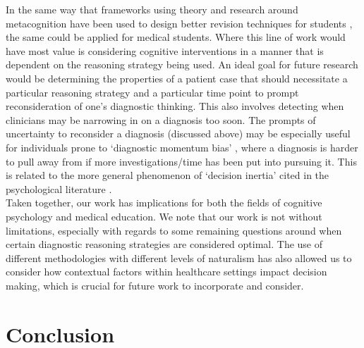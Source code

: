 \documentclass[a4paper, nobind]{templates/ociamthesis}
\begin{document}
In the same way that frameworks using theory and research around metacognition have been used to design better revision techniques for students \autocite{dunlosky_strengthening_2013,putnam_optimizing_2016}, the same could be applied for medical students. Where this line of work would have most value is considering cognitive interventions in a manner that is dependent on the reasoning strategy being used. An ideal goal for future research would be determining the properties of a patient case that should necessitate a particular reasoning strategy and a particular time point to prompt reconsideration of one's diagnostic thinking. This also involves detecting when clinicians may be narrowing in on a diagnosis too soon. The prompts of uncertainty to reconsider a diagnosis (discussed above) may be especially useful for individuals prone to `diagnostic momentum bias' \autocite{ryan_diagnostic_2021,aron_diagnostic_2024}, where a diagnosis is harder to pull away from if more investigations/time has been put into pursuing it. This is related to the more general phenomenon of `decision inertia' cited in the psychological literature \autocite{akaishi_autonomous_2014}.\\

Taken together, our work has implications for both the fields of cognitive psychology and medical education. We note that our work is not without limitations, especially with regards to some remaining questions around when certain diagnostic reasoning strategies are considered optimal. The use of different methodologies with different levels of naturalism has also allowed us to consider how contextual factors within healthcare settings impact decision making, which is crucial for future work to incorporate and consider.

\section{Conclusion}\label{conclusion}
\end{document}
